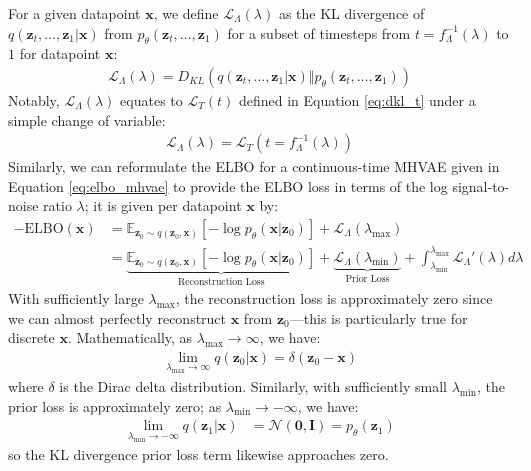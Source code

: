 \documentclass[ oneside,%
                    author={George Herbert},
                    degree={MSci},
                     title={Video Diffusion Models for Climate Simulations},
                  subtitle={}]{dissertation}
\begin{document}
For a given datapoint $\mathbf{x}$, we define $\mathcal{L}_\Lambda(\lambda)$ as the KL divergence of $q(\mathbf{z}_t,\ldots,\mathbf{z}_1|\mathbf{x})$ from $p_\theta(\mathbf{z}_t,\ldots,\mathbf{z}_1)$ for a subset of timesteps from $t=f_\Lambda^{-1}(\lambda)$ to $1$ for datapoint $\mathbf{x}$:
\begin{align}
      \mathcal{L}_\Lambda(\lambda)=D_{KL}(q(\mathbf{z}_t,\ldots,\mathbf{z}_1|\mathbf{x})\Vert p_\theta(\mathbf{z}_t,\ldots,\mathbf{z}_1))
\end{align}
Notably, $\mathcal{L}_\Lambda(\lambda)$ equates to $\mathcal{L}_T(t)$ defined in Equation \ref{eq:dkl_t} under a simple change of variable:
\begin{align}
      \mathcal{L}_\Lambda(\lambda)=\mathcal{L}_T(t=f_\Lambda^{-1}(\lambda))
\end{align}
Similarly, we can reformulate the ELBO for a continuous-time MHVAE given in Equation \ref{eq:elbo_mhvae} to provide the ELBO loss in terms of the log signal-to-noise ratio $\lambda$; it is given per datapoint $\mathbf{x}$ by:
\begin{align}
      -\mathrm{ELBO}(\mathbf{x})&=\mathbb{E}_{\mathbf{z}_0\sim q(\mathbf{z}_0,\mathbf{x})}\left[-\log p_\theta(\mathbf{x}|\mathbf{z}_0)\right]+\mathcal{L}_\Lambda(\lambda_{\max})\\
      &=\underbrace{\mathbb{E}_{\mathbf{z}_0\sim q(\mathbf{z}_0,\mathbf{x})}\left[-\log p_\theta(\mathbf{x}|\mathbf{z}_0)\right]}_{\text{Reconstruction Loss}}+\underbrace{\mathcal{L}_\Lambda(\lambda_{\min})}_{\text{Prior Loss}}+\int_{\lambda_{\min}}^{\lambda_{\max}}\mathcal{L}_\Lambda'(\lambda)d\lambda\label{eq:diffusion_elbo}
\end{align}
With sufficiently large $\lambda_{\max}$, the reconstruction loss is approximately zero since we can almost perfectly reconstruct $\mathbf{x}$ from $\mathbf{z}_0$---this is particularly true for discrete $\mathbf{x}$. Mathematically, as $\lambda_{\max}\to\infty$, we have:
\begin{align}
      \lim_{\lambda_{\max}\to\infty}q(\mathbf{z}_0|\mathbf{x})=\delta(\mathbf{z}_0-\mathbf{x})
\end{align}
where $\delta$ is the Dirac delta distribution. Similarly, with sufficiently small $\lambda_{\min}$, the prior loss is approximately zero; as $\lambda_{\min}\to-\infty$, we have:
\begin{align}
      \lim_{\lambda_{\min}\to -\infty} q(\mathbf{z}_1|\mathbf{x})&=\mathcal{N}(\mathbf{0}, \mathbf{I})=p_\theta(\mathbf{z}_1)
\end{align}
so the KL divergence prior loss term likewise approaches zero.
\end{document}
